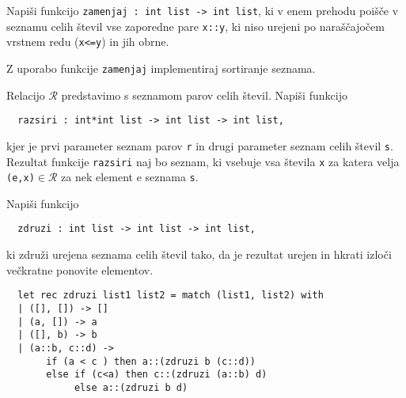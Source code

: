 \begin{ex}
  Napi\v si funkcijo \lstinline{zamenjaj : int list -> int list}, ki v
  enem prehodu poi\v s\v ce v seznamu celih \v stevil vse zaporedne
  pare \lstinline{x::y}, ki niso urejeni po nara\v s\v cajo\v cem vrstnem
  redu (\lstinline{x<=y}) in jih obrne.

  Z uporabo funkcije \lstinline{zamenjaj} implementiraj sortiranje seznama.


\end{ex} 
\begin{ex}
  Relacijo $\mathcal{R}$ predstavimo s seznamom parov celih \v
  stevil. Napi\v si funkcijo

  \begin{lstlisting}
  razsiri : int*int list -> int list -> int list,
  \end{lstlisting}

  kjer je prvi parameter seznam parov \lstinline{r} in drugi parameter
  seznam celih \v stevil \lstinline{s}. Rezultat funkcije
  \lstinline{razsiri} naj bo seznam, ki vsebuje vsa \v stevila \lstinline{x}
  za katera velja \lstinline{(e,x)}$\in\mathcal{R}$ za nek element e
  seznama \lstinline{s}.


\end{ex} 
\begin{ex}
  Napi\v si funkcijo

  \begin{lstlisting}
  zdruzi : int list -> int list -> int list,
  \end{lstlisting}

  ki zdru\v zi urejena seznama celih \v stevil tako, da je rezultat
  urejen in hkrati izlo\v ci ve\v ckratne ponovite elementov.


  \begin{sol}
  \begin{lstlisting}
  let rec zdruzi list1 list2 = match (list1, list2) with
  | ([], []) -> []
  | (a, []) -> a
  | ([], b) -> b
  | (a::b, c::d) -> 
       if (a < c ) then a::(zdruzi b (c::d))
       else if (c<a) then c::(zdruzi (a::b) d)
            else a::(zdruzi b d)
  \end{lstlisting}
  \end{sol}

\end{ex} 
